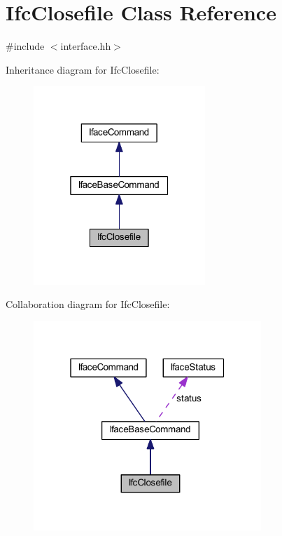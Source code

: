 \hypertarget{class_ifc_closefile}{}\section{Ifc\+Closefile Class Reference}
\label{class_ifc_closefile}


{\ttfamily \#include $<$interface.\+hh$>$}



Inheritance diagram for Ifc\+Closefile\+:
\nopagebreak
\begin{figure}[H]
\begin{center}
\leavevmode
\includegraphics[width=184pt]{class_ifc_closefile__inherit__graph}
\end{center}
\end{figure}


Collaboration diagram for Ifc\+Closefile\+:
\nopagebreak
\begin{figure}[H]
\begin{center}
\leavevmode
\includegraphics[width=244pt]{class_ifc_closefile__coll__graph}
\end{center}
\end{figure}
